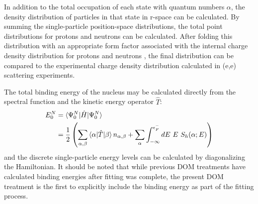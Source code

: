 In addition to the total occupation of each state with quantum numbers $\alpha$,
the density distribution of particles in that state in r-space can be calculated. By summing the
single-particle position-space distributions, the total point distributions for
protons and neutrons can be calculated.
After folding this distribution with an appropriate form factor associated with
the internal charge density
distribution for protons and neutrons \cite{Brown1979}, the final distribution can be compared
to the experimental charge density distribution calculated in (e,e) scattering experiments.

The total binding energy of the nucleus may be calculated directly from the spectral function and the
kinetic energy operator $\hat{T}$:
\begin{equation} \label{TotalEnergyEquation}
    \begin{split}
        E^{N}_{0} & = \braket{\Psi^{N}_{0}|\hat{H}|\Psi^{N}_{0}}\\
        & = \frac{1}{2} \left(\sum_{\alpha,\beta}\braket{\alpha|\hat{T}|\beta}n_{\alpha,\beta}
        + \sum_{\alpha}\int_{-\infty}^{\epsilon_{F}^{-}}dE\ E\ S_{h}(\alpha;E)\right)
    \end{split}
\end{equation}
and the discrete single-particle energy levels can be calculated by diagonalizing the
Hamiltonian. It should be noted that while previous DOM treatments have
calculated binding energies after fitting was complete, the present DOM treatment is the first to
explicitly include the binding energy as part of the fitting process.

